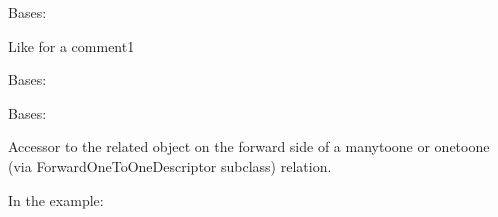 \documentclass[letterpaper,10pt,english]{sphinxmanual}
\begin{document}
\begin{fulllineitems}
\label{\detokenize{forums:forums.models.LikeComment1}}
Bases: {\hyperref[\detokenize{forums:forums.models.AbstractLike}]{}}

Like for a comment1

\begin{fulllineitems}
\label{\detokenize{forums:forums.models.LikeComment1.DoesNotExist}}
Bases: 

\end{fulllineitems}


\begin{fulllineitems}
\label{\detokenize{forums:forums.models.LikeComment1.MultipleObjectsReturned}}
Bases: 

\end{fulllineitems}


\begin{fulllineitems}
\label{\detokenize{forums:forums.models.LikeComment1.comment1}}
Accessor to the related object on the forward side of a many\sphinxhyphen{}to\sphinxhyphen{}one or
one\sphinxhyphen{}to\sphinxhyphen{}one (via ForwardOneToOneDescriptor subclass) relation.

In the example:

\begin{sphinxVerbatim}[commandchars=\\\{\}]
 
       
\end{sphinxVerbatim}


\end{fulllineitems}
\end{fulllineitems}
\end{document}
